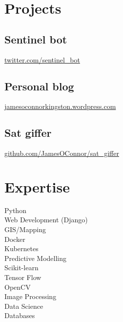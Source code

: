 \documentclass[]{JOC_CV}
\begin{document}
%
%

%
%



%
%

\begin{minipage}[t]{0.33\textwidth}


\section{Projects}\label{sec:projects}

\subsection{Sentinel bot}\label{subsec:sentinel-bot}
 \href{http://twitter.com/sentinel\_bot}{twitter.com/sentinel\_bot}
\subsection{Personal blog}\label{subsec:personal-blog}
\href{jamesoconnorkingston.wordpress.com}{jamesoconnorkingston.wordpress.com}
\subsection{Sat giffer}\label{subsec:sat-giffer}
\href{https://github.com/JamesOConnor/sat\_giffer}{github.com/JamesOConnor/sat\_giffer}
\sectionsep



\section{Expertise}\label{sec:expertise}
Python \\
Web Development (Django) \\
GIS/Mapping \\
Docker \\
Kubernetes \\
Predictive Modelling \\
Scikit-learn \\
Tensor Flow \\
OpenCV \\
Image Processing \\
Data Science \\
Databases \\
\sectionsep


\end{minipage}
\end{document}
